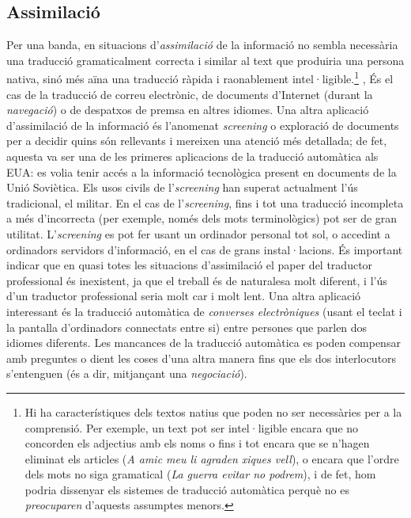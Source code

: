 \subsection{Assimilació} 
\label{s3:assim}
Per una banda, en situacions d'{\em assimilació} de la informació no
sembla necessària una traducció gramaticalment correcta i similar al text que produiria una persona nativa, sinó més aïna una traducció ràpida i
raonablement intel·ligible.\footnote{Hi ha característiques
  dels textos natius que poden no ser necessàries per a la
  comprensió. Per exemple, un text pot ser intel·ligible encara que no
  concorden els adjectius amb els noms o fins i tot encara que se
  n'hagen eliminat els articles (\emph{A amic meu li agraden xiques
    vell}), o encara que l'ordre dels mots no siga gramatical
  (\emph{La guerra evitar no podrem}), i de fet, hom podria dissenyar els sistemes de traducció automàtica perquè no es \emph{preocuparen} d'aquests assumptes menors.} , És el cas de la traducció de
  correu electrònic, de documents d'Internet (durant la
  \emph{navegació}) o de despatxos de premsa en altres idiomes.  Una
  altra aplicació d'assimilació de la informació és l'anomenat
  \emph{screening} o exploració de documents per a decidir quins són
  rellevants i mereixen una atenció més detallada; de fet, aquesta va
  ser una de les primeres aplicacions de la traducció automàtica als
  EUA: es volia tenir accés a la informació tecnològica present en
  documents de la Unió Soviètica. Els usos civils de
  l'\emph{screening} han superat actualment l'ús tradicional, el
  militar. En el cas de l'\emph{screening}, fins i tot una traducció
  incompleta a més d'incorrecta (per exemple, només dels mots
  terminològics) pot ser de gran utilitat.  L'\emph{screening} es pot
  fer usant un ordinador personal tot sol, o accedint a ordinadors
  servidors d'informació, en el cas de grans instal·lacions. És
  important indicar que en quasi totes les situacions d'assimilació el
  paper del traductor professional és inexistent, ja que el treball és
  de naturalesa molt diferent, i l'ús d'un traductor professional
  seria molt car i molt lent.  Una altra aplicació interessant és la
  traducció automàtica de \emph{converses electròniques} (usant el
  teclat i la pantalla d'ordinadors connectats entre si) entre
  persones que parlen dos idiomes diferents. Les mancances de la
  traducció automàtica es poden compensar amb preguntes o dient les
  coses d'una altra manera fins que els dos interlocutors s'entenguen
  (és a dir, mitjançant una \emph{negociació}).

